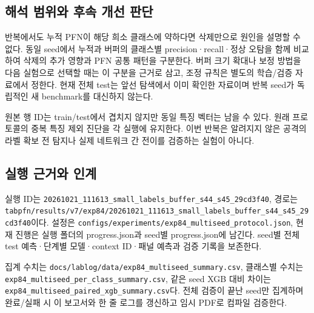\subsection{해석 범위와 후속 개선 판단}
반복에서도 누적 PFN이 해당 희소 클래스에 약하다면 삭제만으로 원인을 설명할 수 없다. 동일 seed에서 누적과 버퍼의 클래스별 precision·recall·정상 오탐을 함께 비교하여 삭제의 추가 영향과 PFN 공통 패턴을 구분한다. 버퍼 크기 확대나 보정 방법을 다음 실험으로 선택할 때는 이 구분을 근거로 삼고, 조정 규칙은 별도의 학습/\allowbreak{}검증 자료에서 정한다. 현재 전체 test는 앞선 탐색에서 이미 확인한 자료이며 반복 seed가 독립적인 새 benchmark를 대신하지 않는다.

원본 행 ID는 train/\allowbreak{}test에서 겹치지 않지만 동일 특징 벡터는 남을 수 있다. 원래 프로토콜의 중복 특징 제외 진단을 각 실행에 유지한다. 이번 반복은 알려지지 않은 공격의 라벨 확보 전 탐지나 실제 네트워크 간 전이를 검증하는 실험이 아니다.

\subsection{실행 근거와 인계}
실행 ID는 \texttt{20261021\allowbreak{}\_\allowbreak{}\allowbreak{}111613\_\allowbreak{}\allowbreak{}small\_\allowbreak{}\allowbreak{}la\allowbreak{}bels\_\allowbreak{}\allowbreak{}buf\allowbreak{}fer\_\allowbreak{}\allowbreak{}s44\_\allowbreak{}\allowbreak{}s45\_\allowbreak{}\allowbreak{}29cd\allowbreak{}3f40}, 경로는 \texttt{tabpfn/\allowbreak{}\allowbreak{}r\allowbreak{}esults/\allowbreak{}\allowbreak{}v\allowbreak{}7/\allowbreak{}\allowbreak{}exp84/\allowbreak{}\allowbreak{}20261021\allowbreak{}\_\allowbreak{}\allowbreak{}111613\_\allowbreak{}\allowbreak{}small\_\allowbreak{}\allowbreak{}la\allowbreak{}bels\_\allowbreak{}\allowbreak{}buf\allowbreak{}fer\_\allowbreak{}\allowbreak{}s44\_\allowbreak{}\allowbreak{}s45\_\allowbreak{}\allowbreak{}29cd\allowbreak{}3f40}이다. 설정은 \texttt{configs/\allowbreak{}\allowbreak{}experime\allowbreak{}nts/\allowbreak{}\allowbreak{}exp8\allowbreak{}4\_\allowbreak{}\allowbreak{}multis\allowbreak{}eed\_\allowbreak{}\allowbreak{}prot\allowbreak{}ocol.\allowbreak{}jso\allowbreak{}n}, 현재 진행은 실행 폴더의 progress.json과 seed별 progress.json에 남긴다. seed별 전체 test 예측·단계별 모델·context ID·패널 예측과 검증 기록을 보존한다.

집계 수치는 \texttt{docs/\allowbreak{}\allowbreak{}lab\allowbreak{}log/\allowbreak{}\allowbreak{}data\allowbreak{}/\allowbreak{}\allowbreak{}exp84\_\allowbreak{}\allowbreak{}m\allowbreak{}ultiseed\allowbreak{}\_\allowbreak{}\allowbreak{}summary\allowbreak{}.\allowbreak{}csv}, 클래스별 수치는 \texttt{exp84\_\allowbreak{}\allowbreak{}mu\allowbreak{}ltiseed\_\allowbreak{}\allowbreak{}per\_\allowbreak{}\allowbreak{}clas\allowbreak{}s\_\allowbreak{}\allowbreak{}summar\allowbreak{}y.\allowbreak{}csv}, 같은 seed XGB 대비 차이는 \texttt{exp84\_\allowbreak{}\allowbreak{}mu\allowbreak{}ltiseed\_\allowbreak{}\allowbreak{}paired\_\allowbreak{}\allowbreak{}x\allowbreak{}gb\_\allowbreak{}\allowbreak{}summa\allowbreak{}ry.\allowbreak{}csv}다. 전체 검증이 끝난 seed만 집계하며 완료/\allowbreak{}실패 시 이 보고서와 한 줄 로그를 갱신하고 임시 PDF로 컴파일 검증한다.



